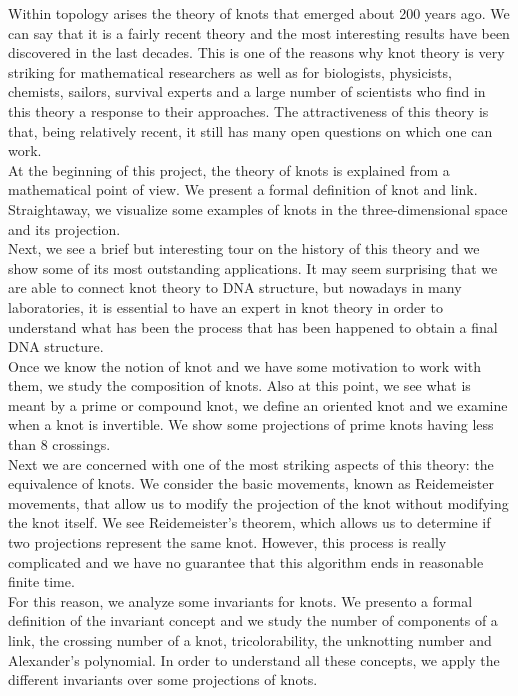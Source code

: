 Within topology arises the theory of knots that emerged about 200 years ago. We can say that it is a fairly recent theory and the most interesting results have been discovered in the last decades. This is one of the reasons why knot theory is very striking for mathematical researchers as well as for biologists, physicists, chemists, sailors, survival experts and a large number of scientists who find in this theory a response to their approaches. The attractiveness of this theory is that, being relatively recent, it still has many open questions on which one can work.\\






At the beginning of this project, the theory of knots is explained from a mathematical point of view. We present a formal definition of knot and link.  Straightaway, we visualize some examples of knots in the three-dimensional space and its projection.\\


Next, we see a brief but interesting tour on the history of this theory and we show some of its most outstanding applications. It may seem surprising that we are able to connect knot theory to DNA structure, but nowadays in many laboratories, it is essential to have an expert in knot theory in order to understand what has been the process that has been happened to obtain a final DNA structure.\\


Once we know the notion of knot and we have some motivation to work with them, we study the composition of knots. Also at this point, we see what is meant by a prime or compound knot, we define an oriented knot and we examine when a knot is invertible. We show some projections of prime knots having less than 8 crossings.\\


Next we are concerned with one of the most striking aspects of this theory: the equivalence of knots. We consider the basic movements, known as Reidemeister movements, that allow us to modify the projection of the knot without modifying the knot itself. We see Reidemeister's theorem, which allows us to determine if two projections represent the same knot. However, this process is really complicated and we have no guarantee that this algorithm ends in reasonable finite time.\\


For this reason, we analyze some invariants for knots. We presento a formal definition of the invariant concept and we study the number of components of a link, the crossing number of a knot, tricolorability, the unknotting number and Alexander's polynomial. In order to understand all these concepts, we apply the different invariants over some projections of knots.\\ 


